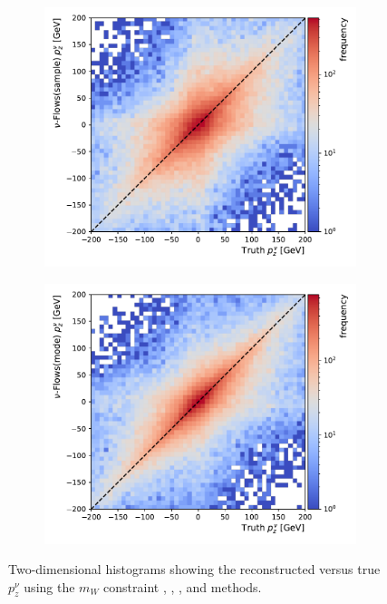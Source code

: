 \begin{figure}[ht]
\begin{subfigure}{0.40\textwidth}
        \caption{} \label{fig:py_dist}
    \end{subfigure}\\
    \begin{subfigure}{0.40\textwidth}
        \includegraphics[width=\textwidth]{Figures/neutrino_unfolding/p_z_sample.pdf}
        \caption{} \label{fig:pz_dist}
    \end{subfigure}
    \begin{subfigure}{0.40\textwidth}
        \includegraphics[width=\textwidth]{Figures/neutrino_unfolding/p_z_mode.pdf}
        \caption{} \label{fig:E_dist}
    \end{subfigure}
    \caption{Two-dimensional histograms showing the reconstructed versus true $p_z^\nu$ using the $m_W$ constraint , \vff {}, \vsample {}, and \vmode {} methods.}
    \label{fig:dists}
\end{figure}

